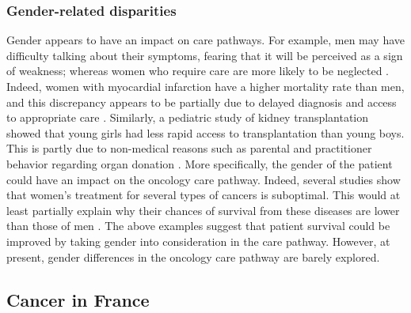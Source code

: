 \subsubsection{Gender-related disparities}


Gender appears to have an impact on care pathways. For example, men may have
difficulty talking about their symptoms, fearing that it will be perceived as a
sign of weakness; whereas women who require care are more likely to be neglected
\cite{ferrari_gender_2018}. Indeed, women with myocardial infarction have a
higher mortality rate than men, and this discrepancy appears to be partially due
to delayed diagnosis and access to appropriate care
\cite{bugiardini_delayed_2017}. Similarly, a pediatric study of kidney
transplantation showed that young girls had less rapid access to transplantation
than young boys. This is partly due to non-medical reasons such as parental and
practitioner behavior regarding organ donation \cite{hogan_j_gender_2016}. More
specifically, the gender of the patient could have an impact on the oncology
care pathway. Indeed, several studies show that women's treatment for several
types of cancers is suboptimal. This would at least partially explain why their
chances of survival from these diseases are lower than those of men
\cite{park_a_undertreatment_2019,carter_paulson_e_gender_2009,rose_sex_2016}.
The above examples suggest that patient survival could be improved by taking
gender into consideration in the care pathway. However, at present, gender
differences in the oncology care pathway are barely explored.

\subsection{Cancer in France}


